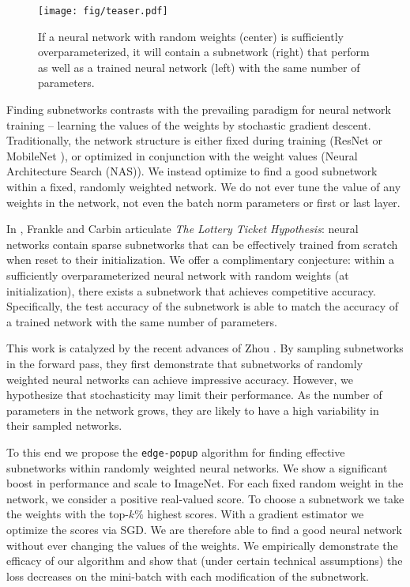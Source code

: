 \documentclass[10pt,twocolumn,letterpaper]{article}
\newcommand{\alg}{\texttt{edge-popup} }
\begin{document}
\begin{figure}[t]
\begin{center}
\texttt{[image: fig/teaser.pdf]}
\end{center}
  \caption{If a neural network with random weights (center) is sufficiently overparameterized, it will contain a subnetwork (right) that perform as well as a trained neural network (left) with the same number of parameters.}

\label{fig:teaser}
\end{figure}
Finding subnetworks contrasts with the prevailing paradigm for neural network training -- learning the values of the weights by stochastic gradient descent. Traditionally, the network structure is either fixed during training (\eg ResNet \cite{resnet} or MobileNet \cite{mobilenet}), or optimized in conjunction with the weight values (\eg Neural Architecture Search (NAS)). We instead optimize to find a good subnetwork within a fixed, randomly weighted network. We do not ever tune the value of any weights in the network, not even the batch norm \cite{batchnorm} parameters or first or last layer.


In \cite{lth}, Frankle and Carbin articulate \textit{The Lottery Ticket Hypothesis}: neural networks contain sparse subnetworks that can be effectively trained from scratch when reset to their initialization.
We offer a complimentary conjecture: within a sufficiently overparameterized neural network with random weights (\eg at initialization), there exists a subnetwork that achieves competitive accuracy. 
Specifically, the test accuracy of the subnetwork is able to match the accuracy of a trained network with the same number of parameters. 

This work is catalyzed by the recent advances of Zhou \etal \cite{supermask}. By sampling subnetworks in the forward pass, they first demonstrate that subnetworks of randomly weighted neural networks can achieve impressive accuracy. However, we hypothesize that stochasticity may limit their performance. As the number of parameters in the network grows, they are likely to have a high variability in their sampled networks.

To this end we propose the \alg algorithm for finding effective subnetworks within randomly weighted neural networks. We show a significant boost in performance and scale to ImageNet. For each fixed random weight in the network, we consider a positive real-valued score. To choose a subnetwork we take the weights with the top-$k\%$ highest scores. With a gradient estimator we optimize the scores via SGD. We are therefore able to find a good neural network without ever changing the values of the weights. We empirically demonstrate the efficacy of our algorithm and show that (under certain technical assumptions) the loss decreases on the mini-batch with each modification of the subnetwork.
\end{document}
